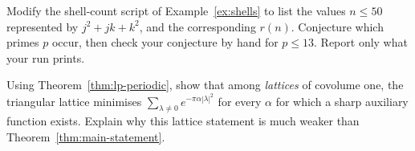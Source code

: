 \begin{exercise}[(E, Python)]
Modify the shell-count script of Example~\ref{ex:shells} to list the values $n\le 50$ represented by $j^2+jk+k^2$, and
the corresponding $r(n)$. Conjecture which primes $p$ occur, then check your conjecture by hand for $p\le 13$. Report
only what your run prints.
\end{exercise}

\begin{exercise}[(H)]
Using Theorem~\ref{thm:lp-periodic}, show that among \emph{lattices} of covolume one, the triangular lattice minimises
$\sum_{\lambda\ne0}e^{-\pi\alpha|\lambda|^2}$ for every $\alpha$ for which a sharp auxiliary function exists. Explain why
this lattice statement is much weaker than Theorem~\ref{thm:main-statement}.
\end{exercise}
